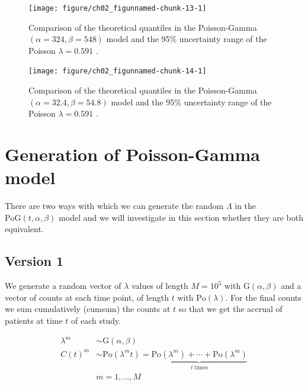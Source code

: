 \begin{figure}
\begin{knitrout}
\color{fgcolor}

{\centering \texttt{[image: figure/ch02\_figunnamed-chunk-13-1]} 

}


\end{knitrout}
  \caption{Comparison of the theoretical quantiles in the Poisson-Gamma $(\alpha = 324, \beta = 548)$ model and the 95\% uncertainty range of the Poisson $\lambda = 0.591$ \citep{spiegelhalter2011visualizing, pkgacc}.}
  \label{fig:2_11}
\end{figure}


\begin{figure}
\begin{knitrout}
\color{fgcolor}

{\centering \texttt{[image: figure/ch02\_figunnamed-chunk-14-1]} 

}


\end{knitrout}
  \caption{Comparison of the theoretical quantiles in the Poisson-Gamma $(\alpha = 32.4, \beta = 54.8)$ model and the 95\% uncertainty range of the Poisson $\lambda = 0.591$ \citep{spiegelhalter2011visualizing, pkgacc}.}
  \label{fig:2_11a}
\end{figure}

\section{Generation of Poisson-Gamma model}

There are two ways with which we can generate the random $\Lambda$ in the $\textrm{PoG}(t, \alpha, \beta)$ model and we will investigate in this section whether they are both equivalent.

\subsection{Version 1}

We generate a random vector of $\lambda$ values of length $M=10^5$ with $\textrm{G}(\alpha, \beta)$ and a vector of counts at each time point, of length $t$ with $\textrm{Po}(\lambda)$. For the final counts we sum cumulatively (cumsum) the counts at $t$ so that we get the accrual of patients at time $t$ of each study.

\begin{align*}
\lambda^m &\sim \textrm{G}(\alpha, \beta) \\
C(t)^m &\sim \textrm{Po} (\lambda^m t) = \underbrace{\textrm{Po} (\lambda^m) +\cdots +\textrm{Po} (\lambda^m)}_{t \ \text{times}}\\
& m = 1, \ldots, M
\end{align*}


